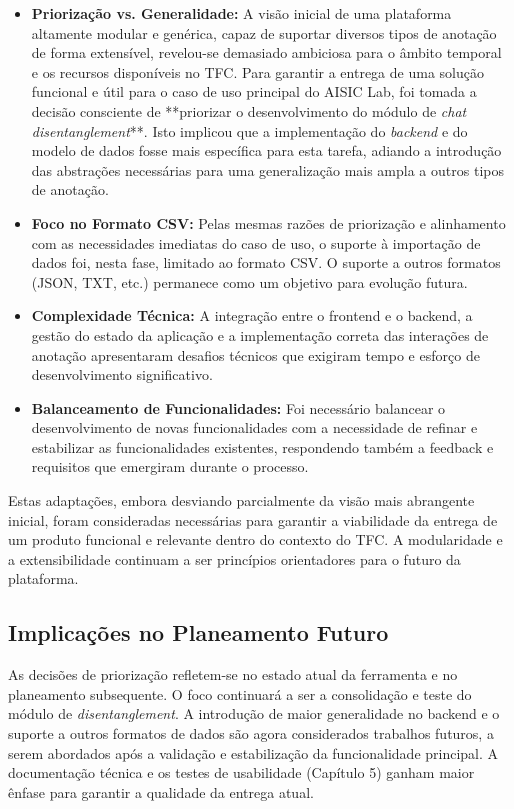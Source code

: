 \begin{itemize}
    \item \textbf{Priorização vs. Generalidade:} A visão inicial de uma plataforma altamente modular e genérica, capaz de suportar diversos tipos de anotação de forma extensível, revelou-se demasiado ambiciosa para o âmbito temporal e os recursos disponíveis no TFC. Para garantir a entrega de uma solução funcional e útil para o caso de uso principal do AISIC Lab, foi tomada a decisão consciente de **priorizar o desenvolvimento do módulo de \textit{chat disentanglement}**. Isto implicou que a implementação do \textit{backend} e do modelo de dados fosse mais específica para esta tarefa, adiando a introdução das abstrações necessárias para uma generalização mais ampla a outros tipos de anotação.
    \item \textbf{Foco no Formato CSV:} Pelas mesmas razões de priorização e alinhamento com as necessidades imediatas do caso de uso, o suporte à importação de dados foi, nesta fase, limitado ao formato CSV. O suporte a outros formatos (JSON, TXT, etc.) permanece como um objetivo para evolução futura.
    \item \textbf{Complexidade Técnica:} A integração entre o frontend e o backend, a gestão do estado da aplicação e a implementação correta das interações de anotação apresentaram desafios técnicos que exigiram tempo e esforço de desenvolvimento significativo.
    \item \textbf{Balanceamento de Funcionalidades:} Foi necessário balancear o desenvolvimento de novas funcionalidades com a necessidade de refinar e estabilizar as funcionalidades existentes, respondendo também a feedback e requisitos que emergiram durante o processo.
\end{itemize}
Estas adaptações, embora desviando parcialmente da visão mais abrangente inicial, foram consideradas necessárias para garantir a viabilidade da entrega de um produto funcional e relevante dentro do contexto do TFC. A modularidade e a extensibilidade continuam a ser princípios orientadores para o futuro da plataforma.

\subsection{Implicações no Planeamento Futuro}
As decisões de priorização refletem-se no estado atual da ferramenta e no planeamento subsequente. O foco continuará a ser a consolidação e teste do módulo de \textit{disentanglement}. A introdução de maior generalidade no backend e o suporte a outros formatos de dados são agora considerados trabalhos futuros, a serem abordados após a validação e estabilização da funcionalidade principal. A documentação técnica e os testes de usabilidade (Capítulo 5) ganham maior ênfase para garantir a qualidade da entrega atual.


